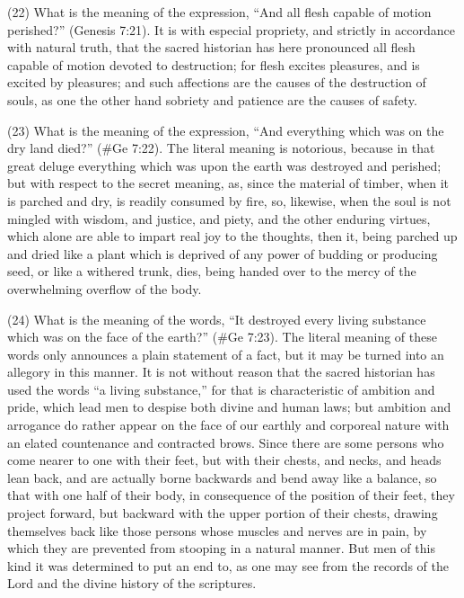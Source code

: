 (22) What is the meaning of the expression, ``And all flesh capable of motion perished?'' (Genesis
7:21). It is with especial propriety, and strictly in accordance with natural truth, that the sacred
historian has here pronounced all flesh capable of motion devoted to destruction; for flesh excites
pleasures, and is excited by pleasures; and such affections are the causes of the destruction of
souls, as one the other hand sobriety and patience are the causes of safety.

(23) What is the meaning of the expression, ``And everything which was on the dry land died?''
(\#Ge 7:22). The literal meaning is notorious, because in that great deluge everything which
was upon the earth was destroyed and perished; but with respect to the secret meaning, as, since
the material of timber, when it is parched and dry, is readily consumed by fire, so, likewise, when
the soul is not mingled with wisdom, and justice, and piety, and the other enduring virtues, which
alone are able to impart real joy to the thoughts, then it, being parched up and dried like a plant
which is deprived of any power of budding or producing seed, or like a withered trunk, dies, being
handed over to the mercy of the overwhelming overflow of the body.

(24) What is the meaning of the words, ``It destroyed every living substance which was on the face
of the earth?'' (\#Ge 7:23). The literal meaning of these words only announces a plain
statement of a fact, but it may be turned into an allegory in this manner. It is not without reason that
the sacred historian has used the words ``a living substance,'' for that is characteristic of ambition
and pride, which lead men to despise both divine and human laws; but ambition and arrogance do
rather appear on the face of our earthly and corporeal nature with an elated countenance and
contracted brows. Since there are some persons who come nearer to one with their feet, but with
their chests, and necks, and heads lean back, and are actually borne backwards and bend away
like a balance, so that with one half of their body, in consequence of the position of their feet, they
project forward, but backward with the upper portion of their chests, drawing themselves back like
those persons whose muscles and nerves are in pain, by which they are prevented from stooping
in a natural manner. But men of this kind it was determined to put an end to, as one may see from
the records of the Lord and the divine history of the scriptures.

